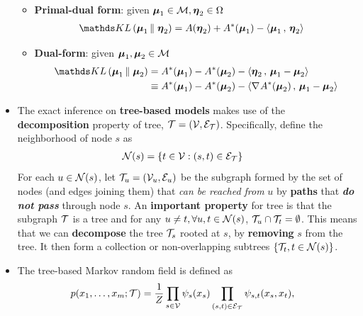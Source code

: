 \documentclass[11pt]{article}
\begin{document}
\begin{itemize}
\begin{itemize}
\item \textbf{Primal-dual form}: given $\boldsymbol{\mu}_1 \in {\mathcal M}, \boldsymbol{\eta}_2 \in \Omega$
\begin{align}
 \kl{\mb{\mu}_1}{\mb{\eta}_2} &= A(\mb{\eta}_2) + A^{*}(\mb{\mu}_1) - \inn{\mb{\mu}_{1}}{\mb{\eta}_2}  \label{eqn: kl_primal_dual}
\end{align}

\item \textbf{Dual-form}: given $\boldsymbol{\mu}_1, \boldsymbol{\mu}_2  \in {\mathcal M}$
\begin{align}
 \kl{\mb{\mu}_1}{\mb{\mu}_2} &= A^{*}(\mb{\mu}_1) - A^{*}(\mb{\mu}_{2}) - \inn{\mb{\eta}_2}{\mb{\mu}_{1} - \mb{\mu}_{2}}  \label{eqn: kl_dual} \\
 &\equiv  A^{*}(\mb{\mu}_1) - A^{*}(\mb{\mu}_{2}) - \inn{\grad{}{A^{*}}(\mb{\mu}_{2})}{\mb{\mu}_{1} - \mb{\mu}_{2}} \nonumber
\end{align}
\end{itemize}


\item The exact inference on \textbf{tree-based models} makes use of the \textbf{decomposition} property of tree, ${\mathcal T} = ({\mathcal V}, {\mathcal E}_{{\mathcal T}})$. Specifically, define the neighborhood of node $s$ as
\begin{align*}
{\mathcal N}(s) &= \left\{t\in {\mathcal V}: (s,t) \in {\mathcal E}_{{\mathcal T}} \right\}
\end{align*} For each $u \in {\mathcal N}(s)$, let ${\mathcal T}_u = ({\mathcal V}_u, {\mathcal E}_u)$ be the subgraph formed by the set of nodes (and edges joining them) that \emph{can be reached from} $u$ by \textbf{paths} that \emph{\textbf{do not pass}} through node $s$. An \textbf{important property} for tree is that the subgraph ${\mathcal T}$ is a tree and  for any $u\neq t,  \forall u,t \in {\mathcal N}(s)$, ${\mathcal T}_{u} \cap {\mathcal T}_{t} = \emptyset$.  This means that we can \textbf{decompose} the tree ${\mathcal T}_{s}$ rooted at $s$, by \textbf{removing} $s$ from the tree. It then form a collection or non-overlapping subtrees $\{{\mathcal T}_t, t \in {\mathcal N}(s)\}$.

\item The tree-based Markov random field is defined as 
\begin{align}
p(x_1, \ldots, x_{m}; {\mathcal T}) &= \frac{1}{Z}\prod_{s\in {\mathcal V}}\psi_{s}(x_{s})\prod_{(s,t) \in {\mathcal E}_{{\mathcal T}}}\psi_{s,t}(x_{s}, x_{t}), \label{eqn: mrf_tree_factorization}
\end{align}


\end{itemize}
\end{document}

